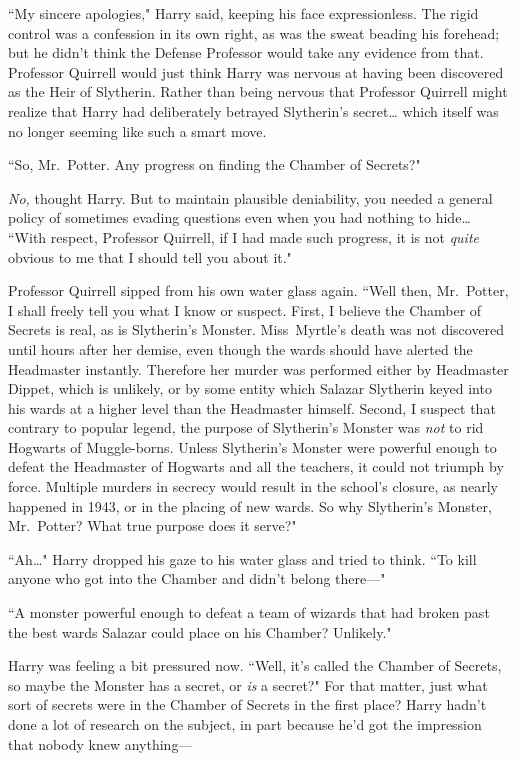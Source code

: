 ``My sincere apologies," Harry said, keeping his face expressionless. The rigid control was a confession in its own right, as was the sweat beading his forehead; but he didn't think the Defense Professor would take any evidence from that. Professor Quirrell would just think Harry was nervous at having been discovered as the Heir of Slytherin. Rather than being nervous that Professor Quirrell might realize that Harry had deliberately betrayed Slytherin's secret{\ldots} which itself was no longer seeming like such a smart move.

``So, Mr.~Potter. Any progress on finding the Chamber of Secrets?"

\emph{No,} thought Harry. But to maintain plausible deniability, you needed a general policy of sometimes evading questions even when you had nothing to hide{\ldots} ``With respect, Professor Quirrell, if I had made such progress, it is not \emph{quite} obvious to me that I should tell you about it."

Professor Quirrell sipped from his own water glass again. ``Well then, Mr.~Potter, I shall freely tell you what I know or suspect. First, I believe the Chamber of Secrets is real, as is Slytherin's Monster. Miss~Myrtle's death was not discovered until hours after her demise, even though the wards should have alerted the Headmaster instantly. Therefore her murder was performed either by Headmaster Dippet, which is unlikely, or by some entity which Salazar Slytherin keyed into his wards at a higher level than the Headmaster himself. Second, I suspect that contrary to popular legend, the purpose of Slytherin's Monster was \emph{not} to rid Hogwarts of Muggle-borns. Unless Slytherin's Monster were powerful enough to defeat the Headmaster of Hogwarts and all the teachers, it could not triumph by force. Multiple murders in secrecy would result in the school's closure, as nearly happened in 1943, or in the placing of new wards. So why Slytherin's Monster, Mr.~Potter? What true purpose does it serve?"

``Ah{\ldots}" Harry dropped his gaze to his water glass and tried to think. ``To kill anyone who got into the Chamber and didn't belong there—"

``A monster powerful enough to defeat a team of wizards that had broken past the best wards Salazar could place on his Chamber? Unlikely."

Harry was feeling a bit pressured now. ``Well, it's called the Chamber of Secrets, so maybe the Monster has a secret, or \emph{is} a secret?" For that matter, just what sort of secrets were in the Chamber of Secrets in the first place? Harry hadn't done a lot of research on the subject, in part because he'd got the impression that nobody knew anything—

